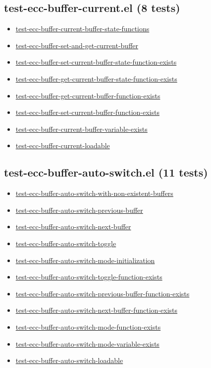 \documentclass[11pt]{article}
\begin{document}
\subsection{test-ecc-buffer-current.el (8 tests)}
\label{sec:org8314d5f}
\begin{itemize}
\item \href{test-ecc-buffer-current.el}{test-ecc-buffer-current-buffer-state-functions}
\item \href{test-ecc-buffer-current.el}{test-ecc-buffer-set-and-get-current-buffer}
\item \href{test-ecc-buffer-current.el}{test-ecc-buffer-set-current-buffer-state-function-exists}
\item \href{test-ecc-buffer-current.el}{test-ecc-buffer-get-current-buffer-state-function-exists}
\item \href{test-ecc-buffer-current.el}{test-ecc-buffer-get-current-buffer-function-exists}
\item \href{test-ecc-buffer-current.el}{test-ecc-buffer-set-current-buffer-function-exists}
\item \href{test-ecc-buffer-current.el}{test-ecc-buffer-current-buffer-variable-exists}
\item \href{test-ecc-buffer-current.el}{test-ecc-buffer-current-loadable}
\end{itemize}
\subsection{test-ecc-buffer-auto-switch.el (11 tests)}
\label{sec:org165e295}
\begin{itemize}
\item \href{test-ecc-buffer-auto-switch.el}{test-ecc-buffer-auto-switch-with-non-existent-buffers}
\item \href{test-ecc-buffer-auto-switch.el}{test-ecc-buffer-auto-switch-previous-buffer}
\item \href{test-ecc-buffer-auto-switch.el}{test-ecc-buffer-auto-switch-next-buffer}
\item \href{test-ecc-buffer-auto-switch.el}{test-ecc-buffer-auto-switch-toggle}
\item \href{test-ecc-buffer-auto-switch.el}{test-ecc-buffer-auto-switch-mode-initialization}
\item \href{test-ecc-buffer-auto-switch.el}{test-ecc-buffer-auto-switch-toggle-function-exists}
\item \href{test-ecc-buffer-auto-switch.el}{test-ecc-buffer-auto-switch-previous-buffer-function-exists}
\item \href{test-ecc-buffer-auto-switch.el}{test-ecc-buffer-auto-switch-next-buffer-function-exists}
\item \href{test-ecc-buffer-auto-switch.el}{test-ecc-buffer-auto-switch-mode-function-exists}
\item \href{test-ecc-buffer-auto-switch.el}{test-ecc-buffer-auto-switch-mode-variable-exists}
\item \href{test-ecc-buffer-auto-switch.el}{test-ecc-buffer-auto-switch-loadable}
\end{itemize}
\end{document}
